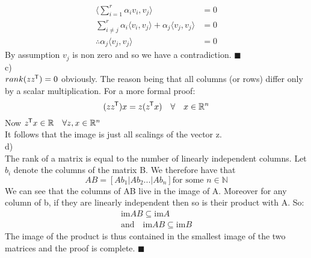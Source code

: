 \documentclass{article}
\newcommand*{\tran}{^{\mkern-1.5mu\mathsf{T}}}%
\begin{document}
	\begin{align*}
			\langle \sum_{i=1}^{r}\alpha_i v_i, v_j \rangle &= 0\\
			\sum_{i\neq j}^{r}\alpha_i \langle v_i,v_j \rangle + \alpha_j\langle v_j,v_j \rangle &= 0 \\
			\therefore \alpha_j\langle v_j,v_j \rangle &= 0 
	\end{align*}
	By assumption $v_j$ is non zero and so we have a contradiction. $\blacksquare$\\
	c)\\
	$rank(zz\tran) = 0$ obviously. The reason being that all columns (or rows) differ only by a scalar multiplication. For a more formal proof:
	\begin{equation*}
		(zz\tran)x = z(z\tran x) \quad \forall \quad x \in \mathbb{R}^n 
	\end{equation*}
	Now $z\tran x \in \mathbb{R} \quad \forall z,x\in \mathbb{R}^n$\\
	It follows that the image is just all scalings of the vector z.\\
	d)\\
	The rank of a matrix is equal to the number of linearly independent columns. Let $b_i$ denote the columns of the matrix B. We therefore have that \begin{equation*}
		AB = [Ab_1 | Ab_2 ...|Ab_n] \text{for some } n\in \mathbb{N}
	\end{equation*}
	We can see that the columns of AB live in the image of A. Moreover for any column of b, if they are linearly independent then so is their product with A. So:
	\begin{align*}
		\text{im}AB \subseteq \text{im}A \\
		\text{and} \quad \text{im}AB \subseteq \text{im}B
	\end{align*}
	The image of the product is thus contained in the smallest image of the two matrices and the proof is complete. $\blacksquare$
\end{document}
